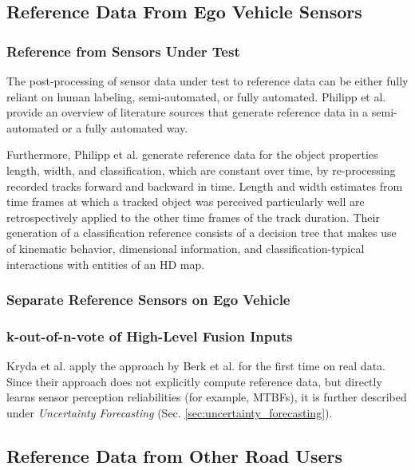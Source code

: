 \documentclass[conference]{IEEEtran}
\newcommand{\citeold}[1]{{\hypersetup{citecolor=black}\cite{#1}}}
\begin{document}
\subsection{Reference Data From Ego Vehicle Sensors}
\label{sec:data_from_ego}

\subsubsection{Reference from Sensors Under Test}

The post-processing of sensor data under test to reference data can be either fully reliant on human labeling, semi-automated, or fully automated. 
Philipp et al. \cite[Sec. II]{Philipp2021reference} provide an overview of literature sources that generate reference data in a semi-automated or a fully automated way. 

Furthermore, Philipp et al. \cite{Philipp2021reference} generate reference data for the object properties length, width, and classification, which are constant over time, by re-processing recorded tracks forward and backward in time.
Length and width estimates from time frames at which a tracked object was perceived particularly well are retrospectively applied to the other time frames of the track duration.
Their generation of a classification reference consists of a decision tree that makes use of kinematic behavior, dimensional information, and classification-typical interactions with entities of an HD map.


\subsubsection{Separate Reference Sensors on Ego Vehicle}

\subsubsection{k-out-of-n-vote of High-Level Fusion Inputs}
\label{sec:ref_data_k_out_of_n}

Kryda et al. \cite{Kryda2021} apply the approach by Berk et al. \citeold{berk2019exploiting} for the first time on real data. 
Since their approach does not explicitly compute reference data, but directly learns sensor perception reliabilities (for example, MTBFs), it is further described under \textit{Uncertainty Forecasting} (Sec. \ref{sec:uncertainty_forecasting}).


\subsection{Reference Data from Other Road Users}
\label{sec:data_from_other_tp}
\end{document}

